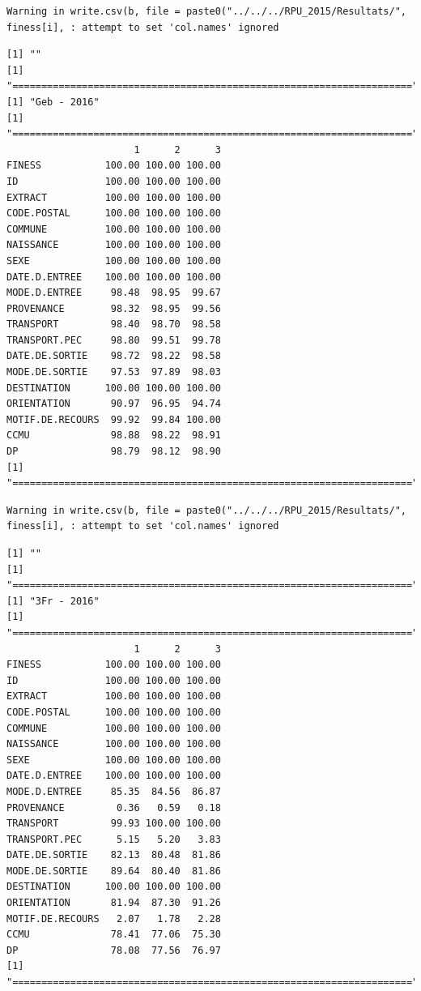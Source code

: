 \documentclass[]{article}
\begin{document}
\begin{verbatim}
Warning in write.csv(b, file = paste0("../../../RPU_2015/Resultats/",
finess[i], : attempt to set 'col.names' ignored
\end{verbatim}

\begin{verbatim}
[1] ""
[1] "====================================================================="
[1] "Geb - 2016"
[1] "====================================================================="
                      1      2      3
FINESS           100.00 100.00 100.00
ID               100.00 100.00 100.00
EXTRACT          100.00 100.00 100.00
CODE.POSTAL      100.00 100.00 100.00
COMMUNE          100.00 100.00 100.00
NAISSANCE        100.00 100.00 100.00
SEXE             100.00 100.00 100.00
DATE.D.ENTREE    100.00 100.00 100.00
MODE.D.ENTREE     98.48  98.95  99.67
PROVENANCE        98.32  98.95  99.56
TRANSPORT         98.40  98.70  98.58
TRANSPORT.PEC     98.80  99.51  99.78
DATE.DE.SORTIE    98.72  98.22  98.58
MODE.DE.SORTIE    97.53  97.89  98.03
DESTINATION      100.00 100.00 100.00
ORIENTATION       90.97  96.95  94.74
MOTIF.DE.RECOURS  99.92  99.84 100.00
CCMU              98.88  98.22  98.91
DP                98.79  98.12  98.90
[1] "====================================================================="
\end{verbatim}

\begin{verbatim}
Warning in write.csv(b, file = paste0("../../../RPU_2015/Resultats/",
finess[i], : attempt to set 'col.names' ignored
\end{verbatim}

\begin{verbatim}
[1] ""
[1] "====================================================================="
[1] "3Fr - 2016"
[1] "====================================================================="
                      1      2      3
FINESS           100.00 100.00 100.00
ID               100.00 100.00 100.00
EXTRACT          100.00 100.00 100.00
CODE.POSTAL      100.00 100.00 100.00
COMMUNE          100.00 100.00 100.00
NAISSANCE        100.00 100.00 100.00
SEXE             100.00 100.00 100.00
DATE.D.ENTREE    100.00 100.00 100.00
MODE.D.ENTREE     85.35  84.56  86.87
PROVENANCE         0.36   0.59   0.18
TRANSPORT         99.93 100.00 100.00
TRANSPORT.PEC      5.15   5.20   3.83
DATE.DE.SORTIE    82.13  80.48  81.86
MODE.DE.SORTIE    89.64  80.40  81.86
DESTINATION      100.00 100.00 100.00
ORIENTATION       81.94  87.30  91.26
MOTIF.DE.RECOURS   2.07   1.78   2.28
CCMU              78.41  77.06  75.30
DP                78.08  77.56  76.97
[1] "====================================================================="
\end{verbatim}
\end{document}
